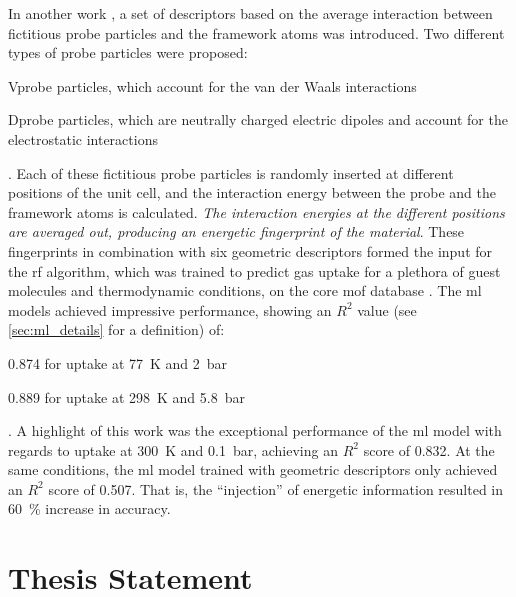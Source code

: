 In another work \parencite{generic}, a set of descriptors based on the average
interaction between fictitious probe particles and the
framework atoms was introduced. Two different types of probe particles were
proposed:
\begin{enumerate*}
	\item Vprobe particles, which account for the van der Waals
		interactions
	\item Dprobe particles, which are neutrally charged electric dipoles and
		account for the electrostatic interactions
\end{enumerate*}.
Each of these fictitious probe particles is randomly inserted at different
positions of the unit cell, and the interaction energy between
the probe and the framework atoms is calculated. \emph{The interaction energies at the
different positions are averaged out, producing an energetic
fingerprint of the material}. These fingerprints in
combination with six geometric descriptors formed the input for the
\gls{rf} algorithm, which was trained to predict gas
uptake for a plethora of guest molecules
and thermodynamic conditions, on the
\gls{core} \gls{mof} database \parencite{chong47}. The
\gls{ml} models achieved impressive performance, showing an $R^2$  value (see
\Section{} \ref{sec:ml_details} for a definition) of:
\begin{enumerate*}
	\item \num{0.874} for  uptake at \SI{77}{\kelvin} and \SI{2}{\bar}
	\item \num{0.889} for  uptake at \SI{298}{\kelvin} and
		\SI{5.8}{\bar}
\end{enumerate*}.
A highlight of this work was the exceptional performance of the \gls{ml} model
with regards to  uptake at \SI{300}{\kelvin} and \SI{0.1}{\bar},
achieving an $R^2$ score of \num{0.832}. At the same conditions, the \gls{ml}
model trained with geometric descriptors only achieved an $R^2$ score of
\num{0.507}. That is, the ``injection'' of energetic information resulted in
\SI{60}{\percent} increase in accuracy.

\section{Thesis Statement}

